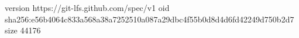 version https://git-lfs.github.com/spec/v1
oid sha256:e56b4064c833a568a38a7252510a087a29dbc4f55b0d8d4d6fd42249d750b2d7
size 44176
